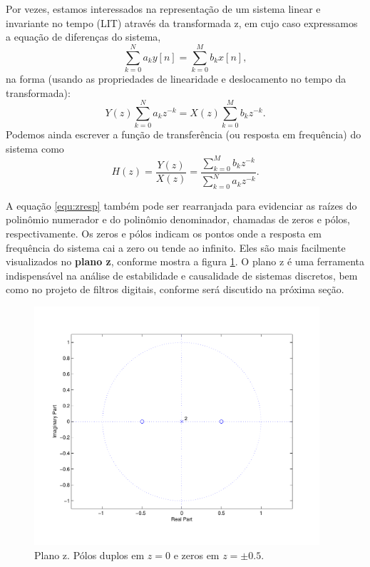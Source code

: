 Por vezes, estamos interessados na representação de um sistema linear e invariante no tempo (LIT) através da transformada z, em cujo caso expressamos a equação de diferenças do sistema,
\begin{equation}
     \sum_{k=0}^{N} a_ky[n] = \sum_{k=0}^{M} b_kx[n],
\end{equation}
na forma (usando as propriedades de linearidade e deslocamento no tempo da transformada):
\begin{equation}
     Y(z)\sum_{k=0}^{N} a_kz^{-k} = X(z)\sum_{k=0}^{M} b_kz^{-k}.
\end{equation}
Podemos ainda escrever a função de transferência (ou resposta em frequência) do sistema como
\begin{equation}
     H(z) = \frac{Y(z)}{X(z)} = \frac{\sum_{k=0}^{M} b_kz^{-k}}{\sum_{k=0}^{N} a_kz^{-k}}.
     \label{equ:zresp}
\end{equation}

A equação \ref{equ:zresp} também pode ser rearranjada para evidenciar as raízes do polinômio numerador e do polinômio denominador, chamadas de zeros e pólos, respectivamente. Os zeros e pólos indicam os pontos onde a resposta em frequência do sistema cai a zero ou tende ao infinito. Eles são mais facilmente visualizados no \textbf{plano z}, conforme mostra a figura \ref{fig:zplane}. O plano z é uma ferramenta indispensável na análise de estabilidade e causalidade de sistemas discretos, bem como no projeto de filtros digitais, conforme será discutido na próxima seção.

\begin{figure}[ht!]
    \centering
    \includegraphics[width=300pt]{figures/chap3-z-plane.pdf}
    \caption[Plano z]{Plano z. Pólos duplos em $z=0$ e zeros em $z=\pm 0.5$.}
    \label{fig:zplane}
\end{figure}


